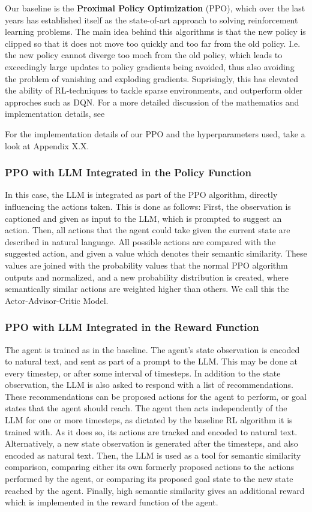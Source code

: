 \documentclass[conference]{IEEEtran}
\begin{document}
Our baseline is the \textbf{Proximal Policy Optimization} (PPO), which over the last years has established itself as the state-of-art approach to solving reinforcement learning problems. The main idea behind this algorithms is that the new policy is clipped so that it does not move too quickly and too far from the old policy. I.e. the new policy cannot diverge too moch from the old policy, which leads to exceedingly large updates to policy gradients being avoided, thus also avoiding the problem of vanishing and exploding gradients. Suprisingly, this has elevated the ability of RL-techniques to tackle sparse environments, and outperform older approches such as DQN. For a more detailed discussion of the mathematics and implementation details, see \cite{OpenAIPPO}

For the implementation details of our PPO and the hyperparameters used, take a look at Appendix X.X.


\subsubsection{PPO with LLM Integrated in the Policy Function}

In this case, the LLM is integrated as part of the PPO algorithm, directly influencing the actions taken. This is done as follows: First, the observation is captioned and given as input to the LLM, which is prompted to suggest an action. Then, all actions that the agent could take given the current state are described in natural language. All possible actions are compared with the suggested action, and given a value which denotes their semantic similarity. These values are joined with the probability values that the normal PPO algorithm outputs and normalized, and a new probability distribution is created, where semantically similar actions are weighted higher than others. We call this the Actor-Advisor-Critic Model.

\subsubsection{PPO with LLM Integrated in the Reward Function}

The agent is trained as in the baseline. The agent's state observation is encoded to natural text, and sent as part of a prompt to the LLM. This may be done at every timestep, or after some interval of timesteps. In addition to the state observation, the LLM is also asked to respond with a list of recommendations. These recommendations can be proposed actions for the agent to perform, or goal states that the agent should reach. The agent then acts independently of the LLM for one or more timesteps, as dictated by the baseline RL algorithm it is trained with. As it does so, its actions are tracked and encoded to natural text. Alternatively, a new state observation is generated after the timesteps, and also encoded as natural text. Then, the LLM is used as a tool for semantic similarity comparison, comparing either its own formerly proposed actions to the actions performed by the agent, or comparing its proposed goal state to the new state reached by the agent. Finally, high semantic similarity gives an additional reward which is implemented in the reward function of the agent. 
\end{document}
